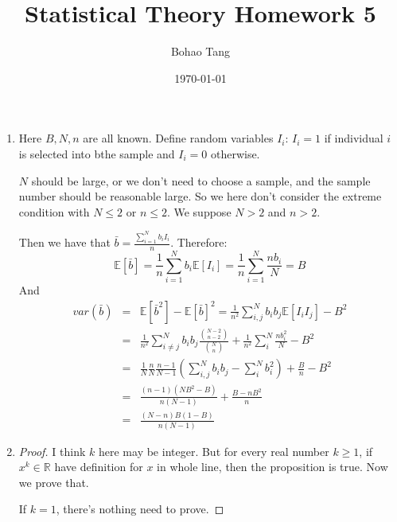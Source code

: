 \documentclass[12pt]{article}
\title{Statistical Theory Homework 5}
\date{\today}
\author{Bohao Tang}
\newcommand{\ep}[1]{\mathbb{E}\left[ #1 \right]}
\newcommand{\var}[1]{var \left( #1 \right)}
\begin{document}

\maketitle

\begin{enumerate}
    \item 
    Here $B, N, n$ are all known. Define random variables $I_i$: $I_i = 1$ if individual $i$ is selected into bthe sample and $I_i = 0$ otherwise.
    
    $N$ should be large, or we don't need to choose a sample, and the sample number should be reasonable large. So we here don't consider the extreme condition with $N \le 2$ or $n \le 2$. We suppose $N > 2$ and $n > 2$. 

    Then we have that $\bar{b} = \frac{\sum_{i=1}^N b_i I_i}{n}$. Therefore:
    $$\ep{\bar{b}} = \frac{1}{n} \sum_{i=1}^N b_i \ep{I_i} = \frac{1}{n} \sum_{i=1}^N \frac{n b_i}{N} = B$$
    And
    \begin{eqnarray}
        \var{\bar{b}} &=& \ep{\bar{b}^2} - \ep{\bar{b}}^2 = \frac{1}{n^2} \sum_{i,j}^{N} b_i b_j \ep{I_i I_j} - B^2 \\
                      &=& \frac{1}{n^2} \sum_{i \ne j}^N b_i b_j \frac{\binom{N-2}{n-2}}{\binom{N}{n}} + \frac{1}{n^2} \sum_{i}^N \frac{n b_i^2}{N} - B^2 \\
                      &=& \frac{1}{N} \frac{n}{N} \frac{n-1}{N-1} (\sum_{i,j}^N b_i b_j - \sum_i^N b_i^2) + \frac{B}{n} - B^2 \\
                      &=& \frac{(n-1) (N B^2 - B)}{n (N-1)} + \frac{B - n B^2}{n} \\
                      &=& \frac{(N-n)B(1-B)}{n(N-1)}
    \end{eqnarray} 

    \item
    \begin{proof}
    I think $k$ here may be integer. But for every real number $k \ge 1$, if $x^k \in \mathbb{R}$ have definition for $x$ in whole line, then the proposition is true. Now we prove that.

    If $k = 1$, there's nothing need to prove.
    

\end{proof}
\end{enumerate}
\end{document}
